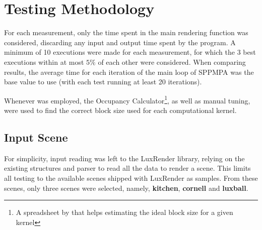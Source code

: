 \documentclass[main.tex]{subfiles}
\begin{document}
\section{Testing Methodology} \label{sec:results:method}


For each measurement, only the time spent in the main rendering function was considered, discarding any input and output time spent by the program. A minimum of 10 executions were made for each measurement, for which the 3 best executions within at most $5\%$ of each other were considered. When comparing results, the average time for each iteration of the main loop of SPPMPA was the base value to use (with each test running at least 20 iterations).

Whenever \cuda was employed, the \cuda Occupancy Calculator\footnote{A spreadsheet by \nvidia that helps estimating the ideal block size for a given kernel}, as well as manual tuning, were used to find the correct block size used for each computational kernel.

\subsection{Input Scene}

For simplicity, input reading was left to the LuxRender library, relying on the existing structures and parser to read all the data to render a scene. This limits all testing to the available scenes shipped with LuxRender as samples. From these scenes, only three scenes were selected, namely, \textbf{kitchen}, \textbf{cornell} and \textbf{luxball}.
\end{document}
